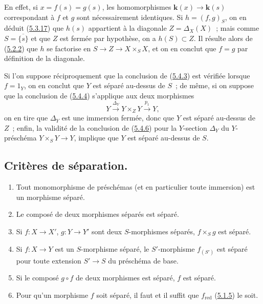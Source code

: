 En effet, si $x=f(s)=g(s)$, les homomorphismes $\boldsymbol{k}(x)\to\boldsymbol{k}(s)$ correspondant à
$f$ et $g$ sont nécessairement identiques. Si $h=(f,g)_S$, on en déduit
(\hyperref[I.5.3.17-fr]{5.3.17}) que $h(s)$ appartient à la diagonale
$Z=\Delta_X(X)$~; mais comme $S=\overline{\{s\}}$ et que $Z$ est fermée par
hypothèse, on a $h(S)\subset Z$. Il résulte alors de
(\hyperref[I.5.2.2-fr]{5.2.2}) que $h$ se factorise en
$S\to Z\to X\times_S X$, et on en conclut que $f=g$ par définition de la
diagonale.

\begin{remark}[5.4.8]
\label{I.5.4.8-fr}
\normalfont Si l'on suppose réciproquement que la conclusion de
(\hyperref[I.5.4.3-fr]{5.4.3}) est vérifiée lorsque $f=1_Y$, on en conclut
que $Y$ est séparé au-dessus de $S$~; de même, si on suppose que la conclusion
de (\hyperref[I.5.4.4-fr]{5.4.4}) s'applique aux deux morphismes
\[
  Y\xrightarrow{\Delta_Y}Y\times_Z Y\xrightarrow{p_1}Y,
\]
on en tire que $\Delta_Y$ est une immersion fermée, donc que $Y$ est séparé
au-dessus de $Z$~; enfin, la validité de la conclusion de
(\hyperref[I.5.4.6-fr]{5.4.6}) pour la $Y$-section $\Delta_Y$ du
$Y$-préschéma $Y\times_S Y\to Y$, implique que $Y$ est séparé au-dessus de
$S$.
\end{remark}

\subsection{Critères de séparation.}
\label{subsection:I.5.5-fr}

\begin{proposition}[5.5.1]
\label{I.5.5.1-fr}
\begin{enumerate}
  \item[\rm(i)] Tout monomorphisme de préschémas (et en particulier toute
    immersion) est un morphisme séparé.
  \item[\rm(ii)] Le composé de deux morphismes séparés est séparé.
  \item[\rm(iii)] Si $f:X\to X'$, $g:Y\to Y'$ sont deux $S$-morphismes
    séparés, $f\times_S g$ est séparé.
  \item[\rm(iv)] Si $f:X\to Y$ est un $S$-morphisme séparé, le
    $S'$-morphisme $f_{(S')}$ est séparé pour toute extension $S'\to S$ du
    préschéma de base.
  \item[\rm(v)] Si le composé $g\circ f$ de deux morphismes est séparé, $f$
    est séparé.
  \item[\rm(vi)] Pour qu'un morphisme $f$ soit séparé, il faut et il suffit
    que $f_{\mathrm{red}}$ \textup{(\hyperref[I.5.1.5-fr]{5.1.5})} le soit.
\end{enumerate}
\end{proposition}

